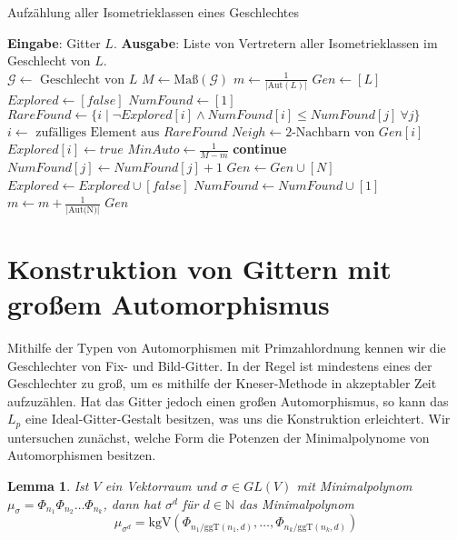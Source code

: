 \documentclass[12pt,a4paper,halfparskip,headsepline,bibtotocnumbered]{scrreprt}
\theoremstyle{nummermitklammern}
\newtheorem{lemma}[defsatzusw]{Lemma}
\theoremstyle{nonumberbreak}
\newcommand{\N}{\mathbb{N}}
\newcommand{\ggT}{\text{ggT}}
\newcommand{\kgV}{\text{kgV}}
\newcommand{\Aut}{\text{Aut}}
\begin{document}
\begin{algorithm}[H]
	\caption{Aufzählung aller Isometrieklassen eines Geschlechtes}\label{alg:knesneigh}
	\begin{algorithmic}[1]
		\State \textbf{Eingabe}: Gitter $L$.
		\State \textbf{Ausgabe}: Liste von Vertretern aller Isometrieklassen im Geschlecht von $L$.
		\\
		\State $\mathcal{G} \gets \text{ Geschlecht von } L$
		\State $M \gets \text{Maß}(\mathcal{G})$
		\State $m \gets \frac{1}{\vert \Aut (L) \vert}$
		\State $Gen \gets \left[ L\right]$
		\State $Explored \gets \left[ false \right]$
		\State $NumFound \gets \left[ 1 \right]$
			\State $RareFound \gets \lbrace i \mid \neg Explored[i] \wedge NumFound[i] \leq NumFound[j]\  \forall j\rbrace$
			\State $i \gets \text{ zufälliges Element aus } RareFound$
			\State $Neigh \gets 2\text{-Nachbarn von } Gen[i]$
			\State $Explored[i] \gets true$
				\State $MinAuto \gets \frac{1}{M-m}$
				\If {$\vert \Aut(N) \vert < MinAuto$}
					\State \textbf{continue}
				\EndIf
					\State $NumFound[j] \gets NumFound[j] + 1$
				\Else
					\State $Gen \gets Gen \cup \left[ N \right]$
					\State $Explored \gets Explored \cup \left[ false \right]$
					\State $NumFound \gets NumFound \cup \left[ 1 \right]$
					\State $m \gets m + \frac{1}{\vert \text{Aut(N)} \vert}$
				\EndIf
			\EndFor
		\EndWhile
		\State \Return $Gen$
	\end{algorithmic}
\end{algorithm}

\section{Konstruktion von Gittern mit großem Automorphismus}

Mithilfe der Typen von Automorphismen mit Primzahlordnung kennen wir die Geschlechter von Fix- und Bild-Gitter. In der Regel ist mindestens eines der Geschlechter zu groß, um es mithilfe der Kneser-Methode in akzeptabler Zeit aufzuzählen. Hat das Gitter jedoch einen großen Automorphismus, so kann das $L_p$ eine Ideal-Gitter-Gestalt besitzen, was uns die Konstruktion erleichtert. Wir untersuchen zunächst, welche Form die Potenzen der Minimalpolynome von Automorphismen besitzen.

\begin{framed}
	\begin{lemma}
		Ist $V$ ein Vektorraum und $\sigma \in GL(V)$ mit Minimalpolynom $\mu_\sigma = \Phi_{n_1} \Phi_{n_2} \dots \Phi_{n_k}$, dann hat $\sigma^d$ für $d \in \N$ das Minimalpolynom
		\begin{equation*}
			\mu_{\sigma^d} = \kgV(\Phi_{n_1 / \ggT(n_1, d)}, \dots, \Phi_{n_k / \ggT(n_k,d)})
		\end{equation*}
	\end{lemma}
\end{framed}
\end{document}
